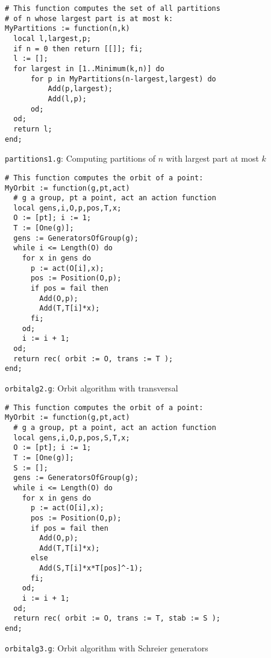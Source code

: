 \documentclass[12pt]{article}
\begin{document}
\vspace*{1cm}
\begin{center}
\begin{minipage}{5in}
\begin{verbatim}
# This function computes the set of all partitions 
# of n whose largest part is at most k:
MyPartitions := function(n,k)
  local l,largest,p;
  if n = 0 then return [[]]; fi;
  l := [];
  for largest in [1..Minimum(k,n)] do
      for p in MyPartitions(n-largest,largest) do
          Add(p,largest);
          Add(l,p);
      od;
  od;
  return l;
end;
\end{verbatim}
\begin{center}\texttt{partitions1.g}: Computing partitions of $n$ with 
largest part at most $k$ \end{center}
\end{minipage}
\end{center}

\newpage
\begin{center}
\begin{minipage}{5in}
\begin{verbatim}
# This function computes the orbit of a point:
MyOrbit := function(g,pt,act)
  # g a group, pt a point, act an action function
  local gens,i,O,p,pos,T,x;
  O := [pt]; i := 1;
  T := [One(g)];
  gens := GeneratorsOfGroup(g);
  while i <= Length(O) do
    for x in gens do
      p := act(O[i],x);
      pos := Position(O,p);
      if pos = fail then
        Add(O,p);
        Add(T,T[i]*x);
      fi;
    od;
    i := i + 1;
  od;
  return rec( orbit := O, trans := T );
end;
\end{verbatim}
\begin{center}\texttt{orbitalg2.g}: Orbit algorithm with transversal\end{center}
\end{minipage}
\end{center}

\vspace*{1cm}
\begin{center}
\begin{minipage}{5in}
\begin{verbatim}
# This function computes the orbit of a point:
MyOrbit := function(g,pt,act)
  # g a group, pt a point, act an action function
  local gens,i,O,p,pos,S,T,x;
  O := [pt]; i := 1;
  T := [One(g)];
  S := [];
  gens := GeneratorsOfGroup(g);
  while i <= Length(O) do
    for x in gens do
      p := act(O[i],x);
      pos := Position(O,p);
      if pos = fail then
        Add(O,p);
        Add(T,T[i]*x);
      else
        Add(S,T[i]*x*T[pos]^-1);
      fi;
    od;
    i := i + 1;
  od;
  return rec( orbit := O, trans := T, stab := S );
end;
\end{verbatim}
\begin{center}\texttt{orbitalg3.g}: Orbit algorithm with Schreier
generators\end{center}
\end{minipage}
\end{center}
\end{document}

